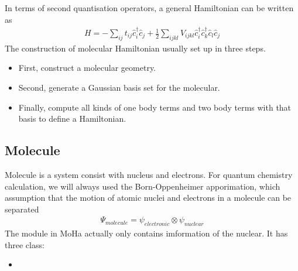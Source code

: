 \documentclass[letterpaper,10pt,english]{sphinxmanual}
\begin{document}
In terms of second quantisation operators, a general Hamiltonian can be written
as
\begin{equation*}
\begin{split}H = - \sum_{ij} t_{ij}\hat{c}^{\dagger}_{i}\hat{c}_{j} + \frac{1}{2} \sum_{ijkl}
V_{ijkl}\hat{c}^{\dagger}_{i}\hat{c}^{\dagger}_{k}\hat{c}_{l}\hat{c}_{j}\end{split}
\end{equation*}
The construction of molecular Hamiltonian usually set up in three steps.
\begin{itemize}
\item {} 
First, construct a molecular geometry.

\item {} 
Second, generate a Gaussian basis set for the molecular.

\item {} 
Finally, compute all kinds of one body terms and two body terms with that basis
to define a Hamiltonian.

\end{itemize}


\subsection{Molecule}
\label{\detokenize{user_molecular_system:molecule}}
Molecule is a system consist with nucleus and electrons. For quantum chemistry
calculation, we will always used the Born-Oppenheimer apporimation, which assumption
that the motion of atomic nuclei and electrons in a molecule can be separated
\begin{equation*}
\begin{split}\Psi_{molecule} = \psi_{electronic} \otimes \psi_{nuclear}\end{split}
\end{equation*}
The module  in MoHa actually only contains imformation of the
nuclear. It has three class:
\begin{itemize}
\item {} 

\end{itemize}
\end{document}
